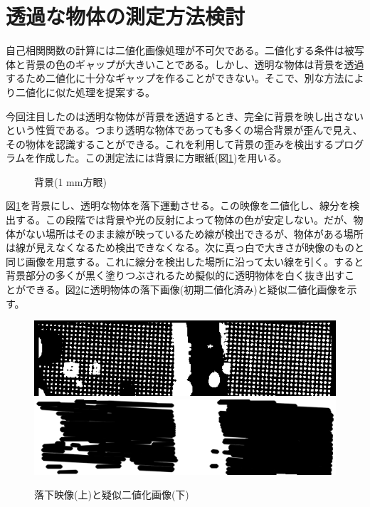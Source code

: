 \documentclass[a4paper,10pt,twocolumn,dvipdfmx]{jsarticle}
\begin{document}
\section{透過な物体の測定方法検討}
自己相関関数の計算には二値化画像処理が不可欠である。二値化する条件は被写体と背景の色のギャップが大きいことである。しかし、透明な物体は背景を透過するため二値化に十分なギャップを作ることができない。そこで、別な方法により二値化に似た処理を提案する。 \par
今回注目したのは透明な物体が背景を透過するとき、完全に背景を映し出さないという性質である。つまり透明な物体であっても多くの場合背景が歪んで見え、その物体を認識することができる。これを利用して背景の歪みを検出するプログラムを作成した。この測定法には背景に方眼紙(図\ref{fig:block})を用いる。
\begin{figure}[H]
	\caption{背景(1 mm方眼)}
	\label{fig:block}
\end{figure}
図\ref{fig:block}を背景にし、透明な物体を落下運動させる。この映像を二値化し、線分を検出する。この段階では背景や光の反射によって物体の色が安定しない。だが、物体がない場所はそのまま線が映っているため線が検出できるが、物体がある場所は線が見えなくなるため検出できなくなる。次に真っ白で大きさが映像のものと同じ画像を用意する。これに線分を検出した場所に沿って太い線を引く。すると背景部分の多くが黒く塗りつぶされるため擬似的に透明物体を白く抜き出すことができる。図\ref{fig:line}に透明物体の落下画像(初期二値化済み)と疑似二値化画像を示す。
\begin{figure}[H]
	\includegraphics[scale=0.4]{water_two.png}
	\includegraphics[scale=0.4]{water_line.png}
	\caption{落下映像(上)と疑似二値化画像(下)}
	\label{fig:line}
\end{figure}
\end{document}
